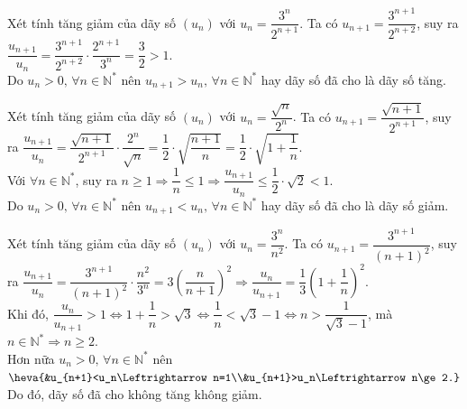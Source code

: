 \begin{bt}%
Xét tính tăng giảm của dãy số $(u_n)$ với $u_n=\dfrac{3^n}{2^{n+1}}$.
	\loigiai 
	{
	Ta có $u_{n+1}=\dfrac{3^{n+1}}{2^{n+2}}$, suy ra $\dfrac{u_{n+1}}{u_n}=\dfrac{3^{n+1}}{2^{n+2}}\cdot \dfrac{2^{n+1}}{3^n}=\dfrac{3}{2}>1$.\\
	Do $u_n>0,\, \forall n\in\mathbb{N}^*$ nên $u_{n+1}>u_n, \, \forall n\in\mathbb{N}^*$ hay dãy số đã cho là dãy số tăng.
	}
\end{bt}

\begin{bt}%
	Xét tính tăng giảm của dãy số $(u_n)$ với $u_n=\dfrac{\sqrt{n}}{2^n}$.
	\loigiai 
	{
		Ta có $u_{n+1}=\dfrac{\sqrt{n+1}}{2^{n+1}}$, suy ra $\dfrac{u_{n+1}}{u_n}=\dfrac{\sqrt{n+1}}{2^{n+1}}\cdot \dfrac{2^n}{\sqrt{n}}=\dfrac{1}{2}\cdot\sqrt{\dfrac{n+1}{n}}=\dfrac{1}{2}\cdot\sqrt{1+\dfrac{1}{n}}$.\\
		Với $\forall n\in\mathbb{N}^*$, suy ra $n\ge 1\Rightarrow \dfrac{1}{n}\le 1\Rightarrow\dfrac{u_{n+1}}{u_n}\le \dfrac{1}{2}\cdot\sqrt{2}<1$.\\
		Do $u_n>0,\, \forall n\in\mathbb{N}^*$ nên $u_{n+1}<u_n, \, \forall n\in\mathbb{N}^*$ hay dãy số đã cho là dãy số giảm.
	}
\end{bt}

\begin{bt}%
	Xét tính tăng giảm của dãy số $(u_n)$ với $u_n=\dfrac{3^n}{n^2}$.
	\loigiai 
	{
		Ta có $u_{n+1}=\dfrac{3^{n+1}}{(n+1)^2}$, suy ra $\dfrac{u_{n+1}}{u_n}=\dfrac{3^{n+1}}{(n+1)^2}\cdot \dfrac{n^2}{3^n}=3\left(\dfrac{n}{n+1}\right)^2\Rightarrow \dfrac{u_n}{u_{n+1}}=\dfrac{1}{3}\left(1+\dfrac{1}{n}\right)^2$.\\
		Khi đó, $\dfrac{u_n}{u_{n+1}}>1\Leftrightarrow 1+\dfrac{1}{n}>\sqrt{3}\Leftrightarrow \dfrac{1}{n}<\sqrt{3}-1\Leftrightarrow n>\dfrac{1}{\sqrt{3}-1}$, mà $n\in\mathbb{N}^*\Rightarrow n\ge 2$.\\
		Hơn nữa $u_n>0,\, \forall n\in\mathbb{N}^*$ nên $\heva{&u_{n+1}<u_n\Leftrightarrow n=1\\&u_{n+1}>u_n\Leftrightarrow n\ge 2.}$\\
		Do đó, dãy số đã cho không tăng không giảm.
	}
\end{bt}

